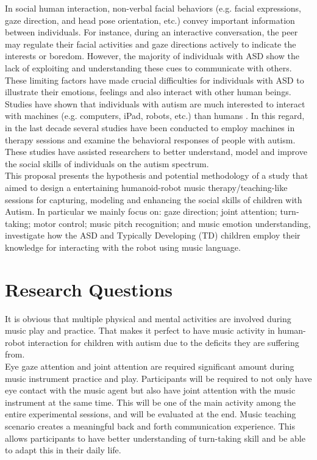 \documentclass[12pt, a4paper]{article}
\begin{document}
In social human interaction, non-verbal facial behaviors (e.g. facial expressions,
gaze direction, and head pose orientation, etc.) convey important information between
individuals. For instance, during an interactive conversation, the peer may regulate their
facial activities and gaze directions actively to indicate the interests or boredom. However,
the majority of individuals with ASD show the lack of exploiting and understanding these
cues to communicate with others. These limiting factors have made crucial difficulties for
individuals with ASD to illustrate their emotions, feelings and also interact with other
human beings. Studies have shown that individuals with autism are much interested to
interact with machines (e.g. computers, iPad, robots, etc.) than humans \cite{SocialInteract2003}. In this regard,
in the last decade several studies have been conducted to employ machines in therapy
sessions and examine the behavioral responses of people with autism. These studies have
assisted researchers to better understand, model and improve the social skills of individuals
on the autism spectrum.\\

This proposal presents the hypothesis and potential methodology of a study that aimed to design a
entertaining humanoid-robot music therapy/teaching-like sessions for capturing, modeling and 
enhancing the social skills of children with Autism. In particular we mainly focus on: gaze 
direction; joint attention; turn-taking; motor control; music pitch recognition;
and music emotion understanding, investigate how the ASD and Typically Developing (TD) children employ 
their knowledge for interacting with the robot using music language.\\

\section*{Research Questions}
It is obvious that multiple physical and mental activities are involved during music
play and practice. That makes it perfect to have music activity in human-robot interaction for
children with autism due to the deficits they are suffering from. \\

Eye gaze attention and joint attention are required significant amount during music instrument practice
and play. Participants will be required to not only have eye contact with the music
agent but also have joint attention with the music instrument at the same time. This will be one of
the main activity among the entire experimental sessions, and will be evaluated at the end.
Music teaching scenario creates a meaningful back and forth communication experience. This allows
participants to have better understanding of turn-taking skill and be able to adapt this 
in their daily life.\\
\end{document}
